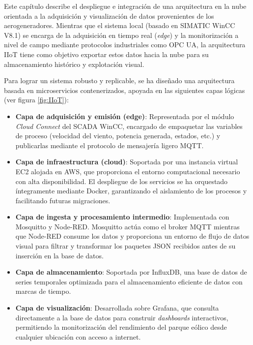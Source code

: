Este capítulo describe el despliegue e integración de una arquitectura en la nube orientada a la adquisición y visualización de datos  provenientes de los aerogeneradores. Mientras que el sistema local (basado en SIMATIC WinCC V8.1) se encarga de la adquisición en tiempo real (\textit{edge}) y la monitorización a nivel de campo mediante protocolos industriales como \ac{OPC UA}, la arquitectura \ac{IIoT} tiene como objetivo exportar estos datos hacia la nube para su almacenamiento histórico y explotación visual.\par

Para lograr un sistema robusto y replicable, se ha diseñado una arquitectura basada en microservicios contenerizados, apoyada en las siguientes capas lógicas (ver figura \ref{fig:IIoT}):

\begin{itemize}
    \item \textbf{Capa de adquisición y emisión (edge)}: Representada por el módulo \textit{Cloud Connect} del \ac{SCADA} WinCC, encargado de empaquetar las variables de proceso (velocidad del viento, potencia generada, estados, etc.) y publicarlas mediante el protocolo de mensajería ligero \ac{MQTT}.
    \item \textbf{Capa de infraestructura (cloud)}: Soportada por una instancia virtual \ac{EC2} alojada en \ac{AWS}, que proporciona el entorno computacional necesario con alta disponibilidad. El despliegue de los servicios se ha orquestado íntegramente mediante Docker, garantizando el aislamiento de los procesos y facilitando futuras migraciones.
    \item \textbf{Capa de ingesta y procesamiento intermedio}: Implementada con Mosquitto y Node-RED. Mosquitto actúa como el broker \ac{MQTT} mientras que Node-RED consume los datos y proporciona un entorno de flujo de datos visual para filtrar y transformar los paquetes \ac{JSON} recibidos antes de su inserción en la base de datos.
    \item \textbf{Capa de almacenamiento}: Soportada por InfluxDB, una base de datos de series temporales optimizada para  el almacenamiento eficiente de datos con marcas de tiempo.
    \item \textbf{Capa de visualización}: Desarrollada sobre Grafana, que consulta directamente a la base de datos para construir \textit{dashboards} interactivos, permitiendo la monitorización del rendimiento del parque eólico desde cualquier ubicación con acceso a internet.
\end{itemize}

